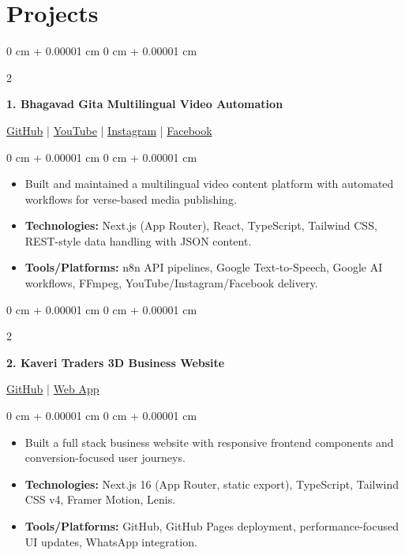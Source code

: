 \documentclass[10pt, a4paper]{article}
\newenvironment{highlights}{
    \begin{itemize}[
        topsep=0.06 cm,
        parsep=0.04 cm,
        partopsep=0pt,
        itemsep=0.02 cm,
        leftmargin=0 cm + 10pt
    ]
}{
    \end{itemize}
}
\newenvironment{onecolentry}{
    \begin{adjustwidth}{
        0 cm + 0.00001 cm
    }{
        0 cm + 0.00001 cm
    }
}{
    \end{adjustwidth}
}
\newenvironment{twocolentry}[2][4.5 cm]{
    \onecolentry
    \def\secondColumn{#2}
    \setcolumnwidth{\fill, #1}
    \begin{paracol}{2}
}{
    \switchcolumn \raggedleft \secondColumn
    \end{paracol}
    \endonecolentry
}
\begin{document}
    \section{Projects}

    \begin{twocolentry}[5.8 cm]{
        \small{\href{https://github.com/nrenx/Bhagavad-gita}{GitHub} | \href{https://www.youtube.com/@Gita_Gyanaam/playlists}{YouTube} | \href{https://www.instagram.com/gita_gyanaam/}{Instagram} | \href{https://www.facebook.com/profile.php?id=61577900636828}{Facebook}}
    }
        \textbf{1. Bhagavad Gita Multilingual Video Automation}
    \end{twocolentry}
    \begin{onecolentry}
        \begin{highlights}
            \item Built and maintained a multilingual video content platform with automated workflows for verse-based media publishing.
            \item \textbf{Technologies:} Next.js (App Router), React, TypeScript, Tailwind CSS, REST-style data handling with JSON content.
            \item \textbf{Tools/Platforms:} n8n API pipelines, Google Text-to-Speech, Google AI workflows, FFmpeg, YouTube/Instagram/Facebook delivery.
        \end{highlights}
    \end{onecolentry}

    \vspace{0.2 cm}

    \begin{twocolentry}{
        \href{https://github.com/nrenx/kaveri_traders}{GitHub} | \href{https://nrenx.github.io/kaveri_traders/}{Web App}
    }
        \textbf{2. Kaveri Traders 3D Business Website}
    \end{twocolentry}
    \begin{onecolentry}
        \begin{highlights}
            \item Built a full stack business website with responsive frontend components and conversion-focused user journeys.
            \item \textbf{Technologies:} Next.js 16 (App Router, static export), TypeScript, Tailwind CSS v4, Framer Motion, Lenis.
            \item \textbf{Tools/Platforms:} GitHub, GitHub Pages deployment, performance-focused UI updates, WhatsApp integration.
        \end{highlights}
    \end{onecolentry}
\end{document}
